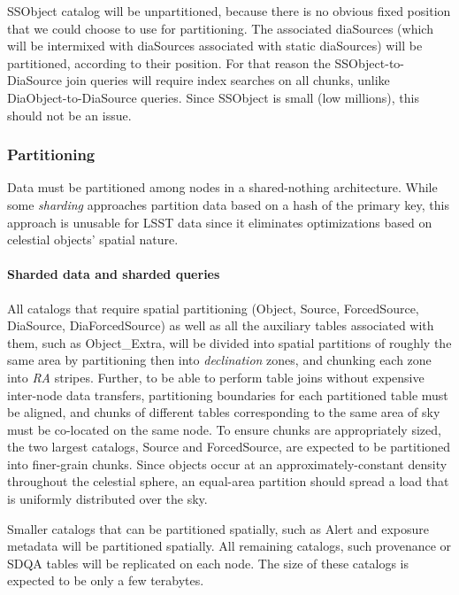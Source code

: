 \documentclass[DM,lsstdraft,toc]{lsstdoc}
\begin{document}
SSObject catalog will be unpartitioned, because there is no obvious
fixed position that we could choose to use for partitioning. The
associated diaSources (which will be intermixed with diaSources
associated with static diaSources) will be partitioned, according to their
position. For that reason the SSObject-to-DiaSource join queries will
require index searches on all chunks, unlike DiaObject-to-DiaSource
queries. Since SSObject is small (low millions), this should not be an
issue.

\subsubsection{Partitioning}\label{partitioning}

Data must be partitioned among nodes in a shared-nothing architecture.
While some \emph{sharding} approaches partition data based on a hash of
the primary key, this approach is unusable for LSST data since it
eliminates optimizations based on celestial objects' spatial nature.

\paragraph{Sharded data and sharded
queries}\label{sharded-data-and-sharded-queries}

All catalogs that require spatial partitioning (Object, Source,
ForcedSource, DiaSource, DiaForcedSource) as well as all the auxiliary
tables associated with them, such as Object\_Extra, will be
divided into spatial partitions of roughly the same area by partitioning
then into \emph{declination} zones, and chunking each zone into
\emph{RA} stripes. Further, to be able to perform table joins without
expensive inter-node data transfers, partitioning boundaries for each
partitioned table must be aligned, and chunks of different tables
corresponding to the same area of sky must be co-located on the same
node. To ensure chunks are appropriately sized, the two largest
catalogs, Source and ForcedSource, are expected to be partitioned into
finer-grain chunks. Since objects occur at an approximately-constant
density throughout the celestial sphere, an equal-area partition should
spread a load that is uniformly distributed over the sky.

Smaller catalogs that can be partitioned spatially, such as Alert and
exposure metadata will be partitioned spatially. All remaining catalogs,
such provenance or SDQA tables will be replicated on each node. The size
of these catalogs is expected to be only a few terabytes.
\end{document}

